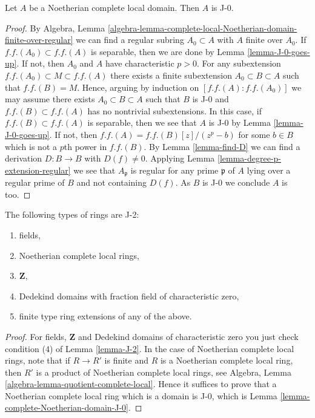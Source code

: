 \begin{lemma}
\label{lemma-complete-Noetherian-domain-J-0}
Let $A$ be a Noetherian complete local domain. Then $A$ is J-0.
\end{lemma}

\begin{proof}
By Algebra, Lemma
\ref{algebra-lemma-complete-local-Noetherian-domain-finite-over-regular}
we can find a regular subring $A_0 \subset A$ with $A$ finite over $A_0$.
If $f.f.(A_0) \subset f.f.(A)$ is separable, then we are done by
Lemma \ref{lemma-J-0-goes-up}. If not, then $A_0$ and $A$
have characteristic $p > 0$. For any subextension
$f.f.(A_0) \subset M \subset f.f.(A)$ there exists a finite subextension
$A_0 \subset B \subset A$ such that $f.f.(B) = M$.
Hence, arguing by induction on $[f.f.(A) : f.f.(A_0)]$ we may
assume there exists $A_0 \subset B \subset A$ such that
$B$ is J-0 and $f.f.(B) \subset f.f.(A)$ has no nontrivial subextensions.
In this case, if $f.f.(B) \subset f.f.(A)$ is separable, then we
see that $A$ is J-0 by Lemma \ref{lemma-J-0-goes-up}.
If not, then $f.f.(A) = f.f.(B)[z]/(z^p - b)$ for some $b \in B$
which is not a $p$th power in $f.f.(B)$.
By Lemma \ref{lemma-find-D}
we can find a derivation $D : B \to B$ with $D(f) \not = 0$.
Applying Lemma \ref{lemma-degree-p-extension-regular}
we see that $A_\mathfrak p$ is regular for any prime
$\mathfrak p$ of $A$ lying over a regular prime of $B$
and not containing $D(f)$. As $B$ is J-0 we conclude $A$ is too.
\end{proof}

\begin{proposition}
\label{proposition-ubiquity-J-2}
The following types of rings are J-2:
\begin{enumerate}
\item fields,
\item Noetherian complete local rings,
\item $\mathbf{Z}$,
\item Dedekind domains with fraction field of characteristic zero,
\item finite type ring extensions of any of the above.
\end{enumerate}
\end{proposition}

\begin{proof}
For fields, $\mathbf{Z}$ and Dedekind domains of characteristic zero
you just check condition (4) of Lemma \ref{lemma-J-2}.
In the case of Noetherian complete local rings, note that if
$R \to R'$ is finite and $R$ is a Noetherian complete local ring,
then $R'$ is a product of Noetherian complete local rings, see
Algebra, Lemma \ref{algebra-lemma-quotient-complete-local}.
Hence it suffices to prove that a Noetherian complete local ring
which is a domain is J-0, which is
Lemma \ref{lemma-complete-Noetherian-domain-J-0}.
\end{proof}





